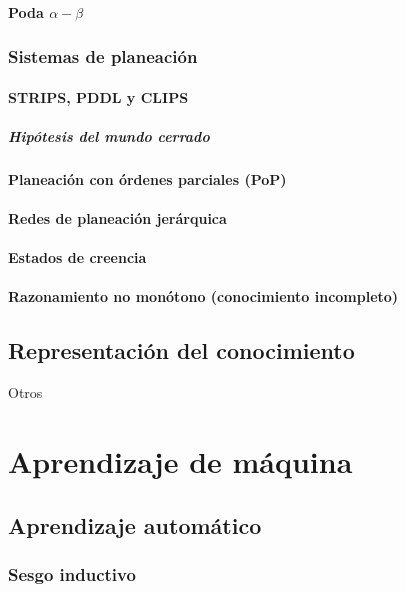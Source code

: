 \documentclass[12pt,openany]{book}
\begin{document}
\subsection{Poda \texorpdfstring{$\alpha-\beta$}{alfa-beta}}

\section{Sistemas de planeación}
\subsection{STRIPS, PDDL y CLIPS}
\subsubsection{Hipótesis del mundo cerrado}
\subsection{Planeación con órdenes parciales (PoP)}
\subsection{Redes de planeación jerárquica}
\subsection{Estados de creencia}
\subsection{Razonamiento no monótono (conocimiento incompleto)}

\chapter{Representación del conocimiento}
Otros


\part{Aprendizaje de máquina}
\chapter{Aprendizaje automático}

\section{Sesgo inductivo}
\end{document}
